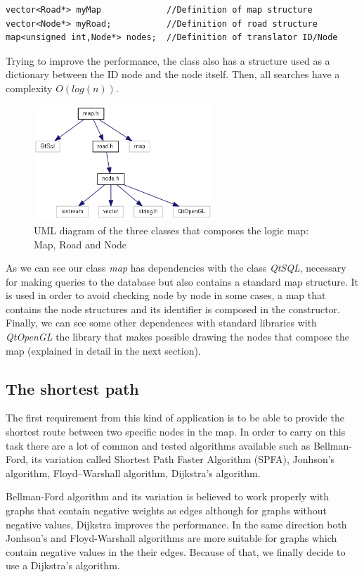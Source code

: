 \documentclass{article}
\begin{document}
\begin{lstlisting}
vector<Road*> myMap 			//Definition of map structure
vector<Node*> myRoad;			//Definition of road structure
map<unsigned int,Node*> nodes;	//Definition of translator ID/Node
\end{lstlisting}

Trying to improve the performance, the class also has a structure used as a dictionary between the ID node and the node itself. Then, all searches have a complexity $ O(log(n)) $.

\begin{figure}[h]
\centering
\includegraphics[width=0.6\textwidth]{map.png}
\caption{UML diagram of the three classes that composes the logic map: Map, Road and Node}
\end{figure}

As we can see our class \textit{map} has dependencies with the class \textit{QtSQL}, necessary for making queries to the database but also contains a standard map structure. It is used in order to avoid checking node by node in some cases, a map that contains the node structures and its identifier is composed in the constructor. Finally, we can see some other dependences with standard libraries with \textit{QtOpenGL} the library that makes possible drawing the nodes that compose the map (explained in detail in the next section).

\subsection{The shortest path}
The first requirement from this kind of application is to be able to provide the shortest route between two specific nodes in the map. In order to carry on this task there are a lot of common and tested algorithms available such as Bellman-Ford, its variation called  Shortest Path Faster Algorithm (SPFA), Jonhson's algorithm, Floyd–Warshall algorithm, Dijkstra's algorithm.

Bellman-Ford algorithm and its variation is believed to work properly with graphs that contain negative weights as edges although for graphs without negative values, Dijkstra improves the performance. In the same direction both Jonhson's and Floyd-Warshall algorithms are more suitable for graphs which contain negative values in the their edges. Because of that, we finally decide to use a Dijkstra's algorithm.
\end{document}
